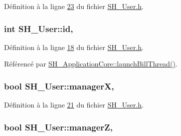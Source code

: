 Définition à la ligne \hyperlink{SH__User_8h_source_l00023}{23} du fichier \hyperlink{SH__User_8h_source}{S\-H\-\_\-\-User.\-h}.

\hypertarget{classSH__User_ad6fb57220df359c4cd28fbd8fcc71b12}{
\subsubsection[{id}]{\setlength{\rightskip}{0pt plus 5cm}int S\-H\-\_\-\-User\-::id\hspace{0.3cm}{\ttfamily [read]}, {\ttfamily [inherited]}}}\label{classSH__User_ad6fb57220df359c4cd28fbd8fcc71b12}


Définition à la ligne \hyperlink{SH__User_8h_source_l00018}{18} du fichier \hyperlink{SH__User_8h_source}{S\-H\-\_\-\-User.\-h}.



Référencé par \hyperlink{classSH__ApplicationCore_a17a048025bc51a96663029e58c722741}{S\-H\-\_\-\-Application\-Core\-::launch\-Bill\-Thread()}.

\hypertarget{classSH__User_a1794a1229076bcaf2de708146db574b3}{
\subsubsection[{manager\-X}]{\setlength{\rightskip}{0pt plus 5cm}bool S\-H\-\_\-\-User\-::manager\-X\hspace{0.3cm}{\ttfamily [read]}, {\ttfamily [inherited]}}}\label{classSH__User_a1794a1229076bcaf2de708146db574b3}


Définition à la ligne \hyperlink{SH__User_8h_source_l00021}{21} du fichier \hyperlink{SH__User_8h_source}{S\-H\-\_\-\-User.\-h}.

\hypertarget{classSH__User_ad5e987610bea0bd50bbc0a1d1ac0aed5}{
\subsubsection[{manager\-Z}]{\setlength{\rightskip}{0pt plus 5cm}bool S\-H\-\_\-\-User\-::manager\-Z\hspace{0.3cm}{\ttfamily [read]}, {\ttfamily [inherited]}}}\label{classSH__User_ad5e987610bea0bd50bbc0a1d1ac0aed5}


